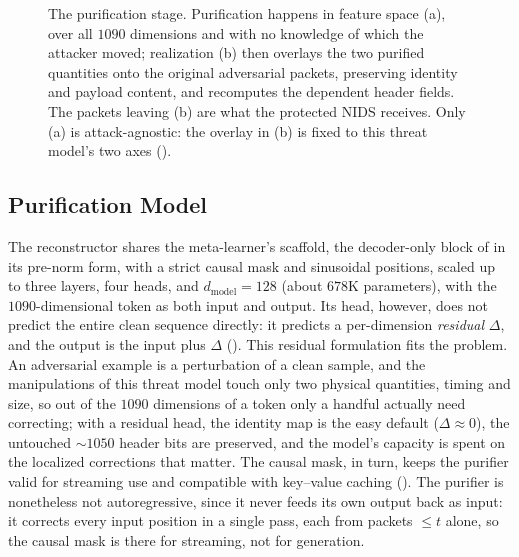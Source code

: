 \begin{figure}[htbp]
    \centering
    \hfill
    \caption[The purification stage.]{The purification stage. Purification happens in
    feature space (a), over all $1090$ dimensions and with no knowledge of which the
    attacker moved; realization (b) then overlays
    the two purified quantities onto the original adversarial packets, preserving
    identity and payload content, and recomputes the dependent header fields. The
    packets leaving (b) are what the protected NIDS receives. Only (a)
    is attack-agnostic: the overlay in (b) is fixed to this threat model's two axes
    ().}
    \label{fig:sol-purifier}
\end{figure}

\subsection{Purification Model}\label{subsec:sol-rec-model}
The reconstructor shares the meta-learner's scaffold, the decoder-only block of
 in its pre-norm form, with a strict causal mask and
sinusoidal positions, scaled up to three layers, four
heads, and $d_{\text{model}}=128$ (about $678$K parameters), with the $1090$-dimensional
token as both input and output. Its head, however, does not predict the entire clean sequence
directly: it predicts a per-dimension \emph{residual} $\Delta$, and the output is the
input plus $\Delta$ (). This residual formulation fits the
problem. An adversarial example is a perturbation of a clean sample, and the
manipulations of this threat model touch only two physical quantities, timing and size, so out of the
$1090$ dimensions of a token only a handful actually need correcting; with a residual
head, the identity map is the easy default ($\Delta \approx 0$), the untouched
$\sim\!1050$ header bits are preserved, and the model's capacity is spent on
the localized corrections that matter. The causal mask, in turn, keeps the purifier
valid for streaming use and compatible with key--value caching
(). The purifier is nonetheless not autoregressive, since it
never feeds its own output back as input: it corrects every input position in a single
pass, each from packets $\leq t$ alone, so the causal mask is there for streaming, not
for generation.

